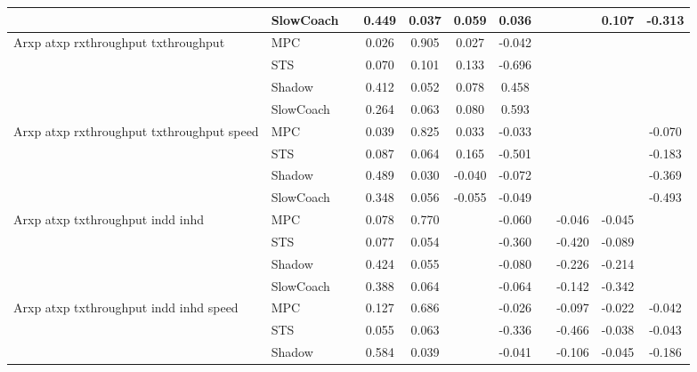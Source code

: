 \begin{tabular}{|l|l|*{9}{c|}}
                              & SlowCoach &       &     0.449 &     0.037 &  0.059 &  0.036 &     &      &   0.107 &   -0.313 \\
\midrule
Arxp atxp rxthroughput txthroughput    & MPC &       &     0.026 &     0.905 &  0.027 & -0.042 &     &      &      &       \\
                              & STS &       &     0.070 &     0.101 &  0.133 & -0.696 &     &      &      &       \\
                              & Shadow &       &     0.412 &     0.052 &  0.078 &  0.458 &     &      &      &       \\
                              & SlowCoach &       &     0.264 &     0.063 &  0.080 &  0.593 &     &      &      &       \\
\midrule
Arxp atxp rxthroughput txthroughput speed    & MPC &       &     0.039 &     0.825 &  0.033 & -0.033 &     &      &      &   -0.070 \\
                              & STS &       &     0.087 &     0.064 &  0.165 & -0.501 &     &      &      &   -0.183 \\
                              & Shadow &       &     0.489 &     0.030 & -0.040 & -0.072 &     &      &      &   -0.369 \\
                              & SlowCoach &       &     0.348 &     0.056 & -0.055 & -0.049 &     &      &      &   -0.493 \\
\midrule
Arxp atxp txthroughput indd inhd    & MPC &       &     0.078 &     0.770 &     & -0.060 &     &  -0.046 &  -0.045 &       \\
                              & STS &       &     0.077 &     0.054 &     & -0.360 &     &  -0.420 &  -0.089 &       \\
                              & Shadow &       &     0.424 &     0.055 &     & -0.080 &     &  -0.226 &  -0.214 &       \\
                              & SlowCoach &       &     0.388 &     0.064 &     & -0.064 &     &  -0.142 &  -0.342 &       \\
\midrule
Arxp atxp txthroughput indd inhd speed    & MPC &       &     0.127 &     0.686 &     & -0.026 &     &  -0.097 &  -0.022 &   -0.042 \\
                              & STS &       &     0.055 &     0.063 &     & -0.336 &     &  -0.466 &  -0.038 &   -0.043 \\
                              & Shadow &       &     0.584 &     0.039 &     & -0.041 &     &  -0.106 &  -0.045 &   -0.186 \\

\end{tabular}

